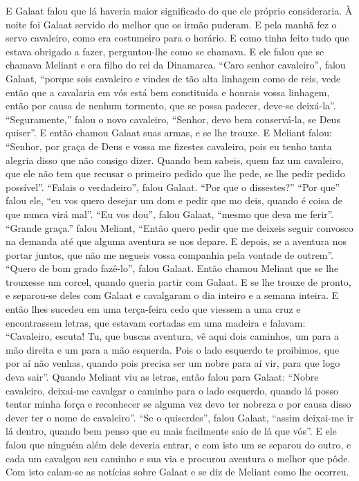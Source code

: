 E Galaat falou que lá haveria maior significado do que ele próprio consideraria.
À noite foi Galaat servido do melhor que os irmão puderam. E pela manhã fez o
servo cavaleiro, como era costumeiro para o horário. E como tinha feito tudo
que estava obrigado a fazer, perguntou-lhe como se chamava. E ele falou que se
chamava Meliant e era filho do rei da Dinamarca. “Caro senhor cavaleiro”, falou
Galaat, “porque sois cavaleiro e vindes de tão alta linhagem como de reis, vede
então que a cavalaria em vós está bem constituída e honrais vossa linhagem,
então por causa de nenhum tormento, que se possa padecer, deve-se deixá-la''.
“Seguramente,” falou o novo cavaleiro, “Senhor, devo bem conservá-la, se Deus
quiser”. E então chamou Galaat suas armas, e se lhe trouxe. E Meliant falou:
“Senhor, por graça de Deus e vossa me fizestes cavaleiro, pois eu tenho tanta
alegria disso que não consigo dizer. Quando bem sabeis, quem faz um cavaleiro,
que ele não tem que recusar o primeiro pedido que lhe pede, se lhe pedir pedido
possível”. “Falais o verdadeiro”, falou Galaat. “Por que o dissestes?” “Por
que” falou ele, “eu vos quero desejar um dom e pedir que mo deis, quando é
coisa de que nunca virá mal”. “Eu vos dou”, falou Galaat, “mesmo que deva me
ferir”. “Grande graça.” falou Meliant, “Então quero pedir que me
deixeis seguir convosco na demanda até que alguma aventura se nos depare. E
depois, se a aventura nos portar juntos, que não me negueis vossa companhia
pela vontade de outrem”. “Quero de bom grado fazê-lo”, falou Galaat. Então
chamou Meliant que se lhe trouxesse um corcel, quando queria partir com Galaat.
E se lhe trouxe de pronto, e separou-se deles com Galaat e cavalgaram o dia
inteiro e a semana inteira. E então lhes sucedeu em uma terça-feira cedo que
viessem a uma cruz e encontrassem letras,  que estavam cortadas em uma madeira
e falavam: “Cavaleiro, escuta! Tu, que buscas aventura, vê aqui dois caminhos,
um para a mão direita e um para a mão esquerda. Pois o lado esquerdo te
proibimos, que por aí não venhas, quando pois precisa ser um nobre para aí vir,
para que logo deva sair”. Quando Meliant viu as letras, então falou para
Galaat: “Nobre cavaleiro, deixai-me cavalgar o caminho para o lado esquerdo,
quando lá posso tentar minha força e reconhecer se alguma vez devo ter nobreza
e por causa disso dever ter o nome de cavaleiro”. “Se o quiserdes”,
falou Galaat, “assim deixai-me ir lá dentro, quando bem penso que eu mais
facilmente saio de lá que vós”. E ele falou que ninguém além dele deveria
entrar, e com isto um se separou do outro, e cada um cavalgou seu caminho e sua
via e procurou aventura o melhor que pôde. Com isto calam-se as notícias sobre
Galaat e se diz de Meliant como lhe ocorreu.

